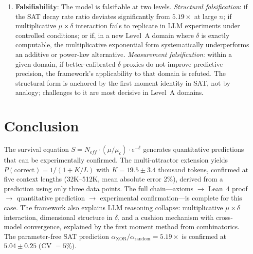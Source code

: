 \documentclass[11pt,a4paper]{article}
\begin{document}
\begin{enumerate}
    \item \textbf{Falsifiability}: The model is falsifiable at two levels. \emph{Structural falsification}: if the SAT decay rate ratio deviates significantly from $5.19\times$ at large $n$; if multiplicative $\mu \times \delta$ interaction fails to replicate in LLM experiments under controlled conditions; or if, in a new Level~A domain where $\delta$ is exactly computable, the multiplicative exponential form systematically underperforms an additive or power-law alternative. \emph{Measurement falsification}: within a given domain, if better-calibrated $\delta$ proxies do not improve predictive precision, the framework's applicability to that domain is refuted. The structural form is anchored by the first moment identity in SAT, not by analogy; challenges to it are most decisive in Level~A domains.
\end{enumerate}

\section{Conclusion}
\label{sec:conclusion}

The survival equation $S = N_{eff} \cdot (\mu/\mu_c) \cdot e^{-\delta}$ generates quantitative predictions that can be experimentally confirmed. The multi-attractor extension yields $P(\text{correct}) = 1/(1 + K/L)$ with $K = 19.5 \pm 3.4$ thousand tokens, confirmed at five context lengths (32K--512K, mean absolute error 2\%), derived from a prediction using only three data points. The full chain---axioms $\to$ Lean~4 proof $\to$ quantitative prediction $\to$ experimental confirmation---is complete for this case. The framework also explains LLM reasoning collapse: multiplicative $\mu \times \delta$ interaction, dimensional structure in $\delta$, and a cushion mechanism with cross-model convergence, explained by the first moment method from combinatorics. The parameter-free SAT prediction $\alpha_{\text{XOR}}/\alpha_{\text{random}} = 5.19\times$ is confirmed at $5.04 \pm 0.25$ (CV $= 5\%$).
\end{document}
